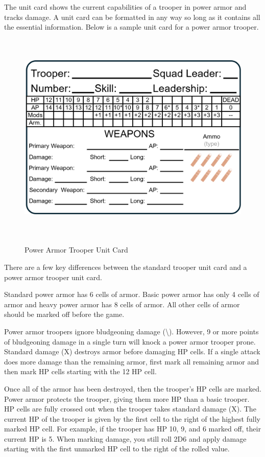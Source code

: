 The unit card shows the current capabilities of a trooper in power armor and tracks damage.
A unit card can be formatted in any way so long as it contains all the essential information.
Below is a sample unit card for a power armor trooper.

\begin{figure}[H]
  \centering
  \includegraphics[alt='Sample Power Armor Trooper', width=5.63in, height=4in]{img/PowerArmorTrooper.png}
  \caption*{Power Armor Trooper Unit Card}
\end{figure}

There are a few key differences between the standard trooper unit card and a power armor trooper unit card.

Standard power armor has 6 cells of armor.
Basic power armor has only 4 cells of armor and heavy power armor has 8 cells of armor.
All other cells of armor should be marked off before the game.

Power armor troopers ignore bludgeoning damage (\textbackslash).
However, 9 or more points of bludgeoning damage in a single turn will knock a power armor trooper prone.
Standard damage (X) destroys armor before damaging HP cells.
If a single attack does more damage than the remaining armor, first mark all remaining armor and then mark HP cells starting with the 12 HP cell.

Once all of the armor has been destroyed, then the trooper's HP cells are marked.
Power armor protects the trooper, giving them more HP than a basic trooper.
HP cells are fully crossed out when the trooper takes standard damage (X).
The current HP of the trooper is given by the first cell to the right of the highest fully marked HP cell.
For example, if the trooper has HP 10, 9, and 6 marked off, their current HP is 5.
When marking damage, you still roll 2D6 and apply damage starting with the first unmarked HP cell to the right of the rolled value.

